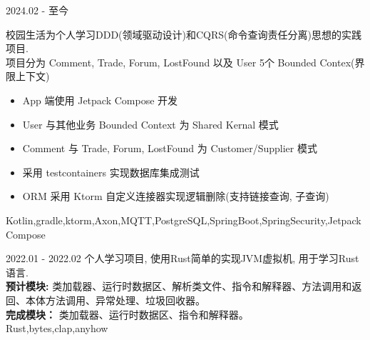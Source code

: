 \documentclass[zh]{resume}
\begin{document}
\begin{projects}
\end{projects}

\begin{projects}
	\project
  {\color{accentcolor}{alumnihub}}{2024.02 - 至今}
  {
    校园生活为个人学习DDD(领域驱动设计)和CQRS(命令查询责任分离)思想的实践项目. \\
    项目分为 Comment, Trade, Forum, LostFound 以及 User 5个 Bounded Contex(界限上下文)
    \begin{itemize}
      \item App 端使用 Jetpack Compose 开发
      \item User 与其他业务 Bounded Context 为 Shared Kernal 模式
      \item Comment 与 Trade, Forum, LostFound 为 Customer/Supplier 模式
      \item 采用 testcontainers 实现数据库集成测试
      \item ORM 采用 Ktorm 自定义连接器实现逻辑删除(支持链接查询, 子查询)
    \end{itemize}
  }
  {Kotlin,gradle,ktorm,Axon,MQTT,PostgreSQL,SpringBoot,SpringSecurity,Jetpack Compose}

	\project
  {\color{accentcolor}{jvmrs}}{2022.01 - 2022.02}
  {
    个人学习项目, 使用Rust简单的实现JVM虚拟机, 用于学习Rust语言. \\
    {\textbf{预计模块: } 类加载器、运行时数据区、解析类文件、指令和解释器、方法调用和返回、本体方法调用、异常处理、垃圾回收器。} \\
    {\textbf{完成模块：} 类加载器、运行时数据区、指令和解释器。} \\
  }
  {Rust,bytes,clap,anyhow}

\end{projects}
\end{document}
